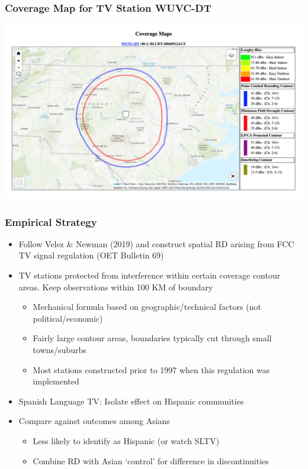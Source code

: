 \documentclass{beamer}
\begin{document}
\begin{frame}
\frametitle{Coverage Map for TV Station WUVC-DT}
\centering
        \includegraphics[width=1\textwidth]{../../analysis/Output/img/ContourExample.png}\\
\end{frame}

\begin{frame}
\frametitle{Empirical Strategy}
\begin{itemize}
\item Follow Velez \& Newman (2019) and construct spatial RD arising from FCC TV signal regulation (OET Bulletin 69)
\item TV stations protected from interference within certain coverage contour areas. Keep observations within 100 KM of boundary
\begin{itemize}
\item Mechanical formula based on geographic/technical factors (not political/economic)
\item Fairly large contour areas, boundaries typically cut through small towns/suburbs
\item Most stations constructed prior to 1997 when this regulation was implemented
\end{itemize}
\item Spanish Language TV: Isolate effect on Hispanic communities

\pause
\item Compare against outcomes among Asians
\begin{itemize}
\item Less likely to identify as Hispanic (or watch SLTV)
\item Combine RD with Asian `control' for difference in discontinuities
\end{itemize}

\end{itemize}

\end{frame}
\end{document}

